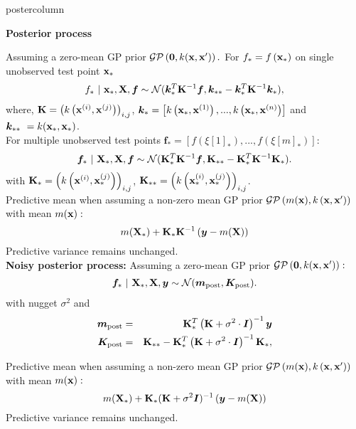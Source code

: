 \documentclass{beamer}
\begin{document}
\begin{frame}[fragile]{}
\begin{columns}
\begin{column}{.31\textwidth}
\begin{beamercolorbox}[center]{postercolumn}
\begin{minipage}{.98\textwidth}
{\begin{myblock}{}
	\textbf{Posterior process} 
	
	Assuming a zero-mean GP prior $\mathcal{GP}\left(\bm{0}, k(\xv, \xv^\prime)\right).$ 
%	
	For $ f_* = f\left(\xv_*\right)$ on single unobserved test point $\xv_*$ 
%	
	\begin{eqnarray*}
		f_* ~|~ \xv_*, \Xmat, \bm{f} \sim \mathcal{N}(\bm{k}_{*}^{T}\Kmat^{-1}\bm{f}, \bm{k}_{**} - \bm{k}_*^T \Kmat ^{-1}\bm{k}_*),
	\end{eqnarray*}
%
	where, $\Kmat = \left(k\left(\xi, \xv^{(j)}\right)\right)_{i,j}$, $\bm{k}_* = \left[k\left(\xv_*, \xi[1]\right), ..., k\left(\xv_*, \xi[n]\right)\right]$ and $ \bm{k}_{**}\ = k(\xv_*, \xv_*)$. \\
	
	For multiple unobserved test points
	$
	\bm{f}_* = \left[f\left(\xi[1]_*\right), ..., f\left(\xi[m]_*\right)\right]:
	$
	\begin{eqnarray*}
		\bm{f}_* ~|~ \Xmat_*, \Xmat, \bm{f} \sim \mathcal{N}(\Kmat_{*}^{T}\Kmat^{-1}\bm{f}, \Kmat_{**} - \Kmat_*^T \Kmat ^{-1}\Kmat_*).
	\end{eqnarray*} 
	with $\Kmat_* = \left(k\left(\xi, \xv_*^{(j)}\right)\right)_{i,j}$, $\Kmat_{**} = \left(k\left(\xi[i]_*, \xi[j]_*\right)\right)_{i,j}$.\\
	
	Predictive mean when assuming a non-zero mean GP prior $\gp$ with mean $m(\xv):$ 
	$$
	m(\Xmat_*) + \Kmat_*\Kmat^{-1}\left(\bm{y} - m(\Xmat)\right)
	$$
	Predictive variance remains unchanged. \\
	
	\textbf{Noisy posterior process:}
%	
	Assuming a zero-mean GP prior $\mathcal{GP}\left(\bm{0}, k(\xv, \xv^\prime)\right):$ 
%	
	\begin{eqnarray*}
		\bm{f}_* ~|~ \Xmat_*, \Xmat, \bm{y} \sim \mathcal{N}(\bm{m}_{\text{post}}, \bm{K}_\text{post}).
	\end{eqnarray*}
	with nugget $\sigma^2 $ and
%	 
	\begin{eqnarray*}
		\bm{m}_{\text{post}} &=& \Kmat_{*}^{T} \left(\Kmat+ \sigma^2 \cdot \id\right)^{-1}\bm{y} \\
		\bm{K}_\text{post} &=& \Kmat_{**} - \Kmat_*^T \left(\Kmat  + \sigma^2 \cdot \id\right)^{-1}	\Kmat_*,	
	\end{eqnarray*} 
%	
	
	Predictive mean when assuming a non-zero mean GP prior $\gp$ with mean $m(\xv):$ 
	$$
	m(\Xmat_*) + \Kmat_*(\Kmat +\sigma^2 \id)^{-1}\left(\bm{y} - m(\Xmat)\right)
	$$
	Predictive variance remains unchanged.
%
%
\end{myblock}


}
\end{minipage}
\end{beamercolorbox}
\end{column}
\end{columns}
\end{frame}
\end{document}

